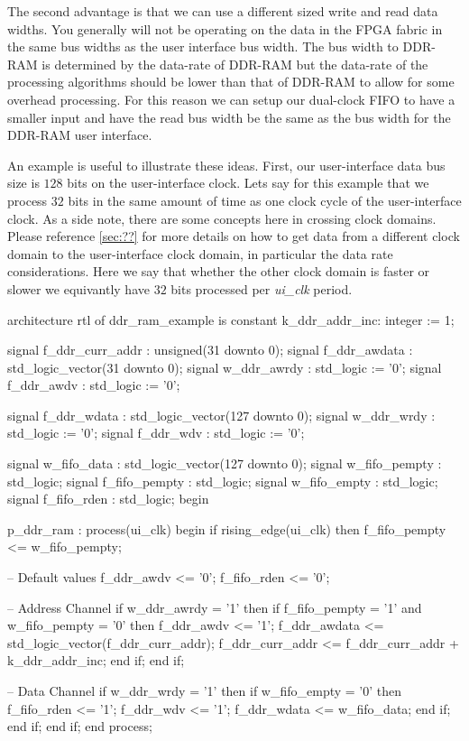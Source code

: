 The second advantage is that we can use a different sized write and read data widths. You generally will not be operating on the data in the \ac{FPGA} fabric in the same bus widths as the user interface bus width. The bus width to \ac{DDR}-\ac{RAM} is determined by the data-rate of \ac{DDR}-\ac{RAM} but the data-rate of the processing algorithms should be lower than that of \ac{DDR}-\ac{RAM} to allow for some overhead processing. For this reason we can setup our dual-clock \ac{FIFO} to have a smaller input and have the read bus width be the same as the bus width for the \ac{DDR}-\ac{RAM} user interface. 

An example is useful to illustrate these ideas. First, our user-interface data bus size is $128$ bits on the user-interface clock. Lets say for this example that we process $32$ bits in the same amount of time as one clock cycle of the user-interface clock. As a side note, there are some concepts here in crossing clock domains. Please reference \ref{sec:??} for more details on how to get data from a different clock domain to the user-interface clock domain, in particular the data rate considerations. Here we say that whether the other clock domain is faster or slower we equivantly have $32$ bits processed per \emph{ui\_clk} period.  

\begin{VHDLlisting}[tabsize=8]
architecture rtl of ddr_ram_example is
	constant k_ddr_addr_inc: integer := 1;
	
	signal f_ddr_curr_addr : unsigned(31 downto 0);
	signal f_ddr_awdata    : std_logic_vector(31 downto 0);
	signal w_ddr_awrdy     : std_logic := '0';
	signal f_ddr_awdv      : std_logic := '0';

	signal f_ddr_wdata     : std_logic_vector(127 downto 0);
	signal w_ddr_wrdy      : std_logic := '0';
	signal f_ddr_wdv       : std_logic := '0';

	signal w_fifo_data     : std_logic_vector(127 downto 0); 
	signal w_fifo_pempty   : std_logic;
	signal f_fifo_pempty   : std_logic;
	signal w_fifo_empty    : std_logic;
	signal f_fifo_rden     : std_logic;	
begin

p_ddr_ram : process(ui_clk)
begin
	if rising_edge(ui_clk) then
		f_fifo_pempty <= w_fifo_pempty;
		
		-- Default values
		f_ddr_awdv <= '0';
		f_fifo_rden <= '0';
		
		-- Address Channel
		if w_ddr_awrdy = '1' then
			if f_fifo_pempty = '1' and w_fifo_pempty = '0' then
				f_ddr_awdv <= '1';
				f_ddr_awdata <= std_logic_vector(f_ddr_curr_addr);
				f_ddr_curr_addr <= f_ddr_curr_addr + k_ddr_addr_inc;
			end if;		
		end if;
		
		-- Data Channel
		if w_ddr_wrdy = '1' then
			if w_fifo_empty = '0' then
				f_fifo_rden <= '1';
				f_ddr_wdv <= '1';
				f_ddr_wdata <= w_fifo_data;
			end if;			
		end if;
	end if;
end process;
\end{VHDLlisting}

